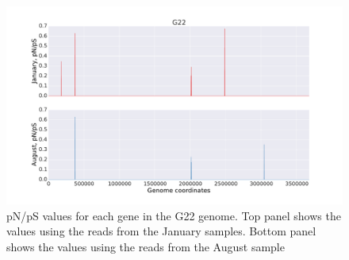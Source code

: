 \begin{figure}[p]
  \centering
  \includegraphics[width=\textwidth,height=\textheight,keepaspectratio]{Chapter5/Figures/pn_ps_plots/G22_pNpS_density.pdf}
  \caption{pN/pS values for each gene in the G22 genome. Top panel shows the values using the reads from the January samples. Bottom panel shows the values using the reads from the August sample}
  \label{G22_pNpS}
\end{figure}

